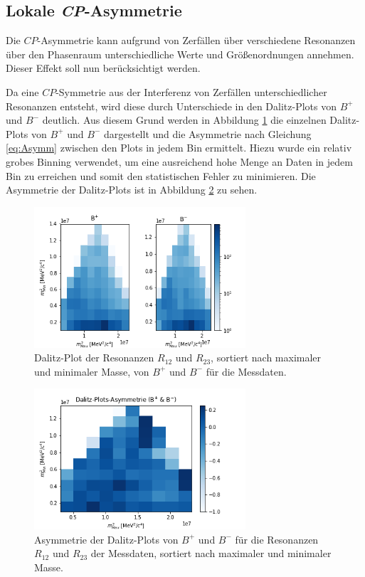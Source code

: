\FloatBarrier

\subsection{Lokale \textit{CP}-Asymmetrie}
Die $CP$-Asymmetrie kann aufgrund von Zerfällen über verschiedene Resonanzen über den Phasenraum unterschiedliche Werte und Größenordnungen annehmen. Dieser Effekt soll nun berücksichtigt werden.

Da eine $CP$-Symmetrie aus der Interferenz von Zerfällen unterschiedlicher Resonanzen entsteht, wird diese durch Unterschiede in den Dalitz-Plots von $B^{+}$ und $B^{-}$ deutlich. Aus diesem Grund werden in Abbildung \ref{fig:DalitzPM} die einzelnen Dalitz-Plots von $B^{+}$ und $B^{-}$ dargestellt und die Asymmetrie nach Gleichung \eqref{eq:Asymm} zwischen den Plots in jedem Bin ermittelt. Hiezu wurde ein relativ grobes Binning verwendet, um eine ausreichend hohe Menge an Daten in jedem Bin zu erreichen und somit den statistischen Fehler zu minimieren. Die Asymmetrie der Dalitz-Plots ist in Abbildung \ref{fig:DalitzDiff} zu sehen.
\begin{figure}
  \centering
  \includegraphics[width=0.7\textwidth]{plots/Bp_Bm_Dalitz.png}
  \caption{Dalitz-Plot der Resonanzen $R_{12}$ und $R_{23}$, sortiert nach maximaler und minimaler Masse, von $B^{+}$ und $B^{-}$ für die Messdaten.}
  \label{fig:DalitzPM}
\end{figure}
\FloatBarrier
\begin{figure}
  \centering
  \includegraphics[width=0.7\textwidth]{plots/Asymm_Dalitz.png}
  \caption{Asymmetrie der Dalitz-Plots von $B^{+}$ und $B^{-}$ für die Resonanzen $R_{12}$ und $R_{23}$ der Messdaten, sortiert nach maximaler und minimaler Masse.}
  \label{fig:DalitzDiff}
\end{figure}
